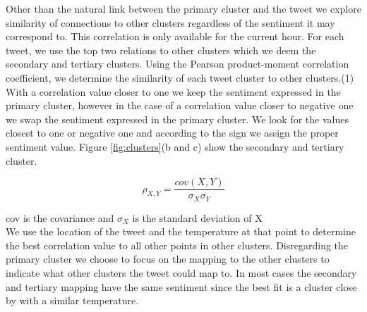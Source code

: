 \documentclass[journal]{vgtc}                %
\begin{document}
Other than the natural link between the primary cluster and the tweet we explore similarity of connections to other clusters regardless of the sentiment it may correspond to. This correlation is only available for the current hour. For each tweet, we use the top two relations to other clusters which we deem the secondary and tertiary clusters. Using the Pearson product-moment correlation coefficient, we determine the similarity of each tweet cluster to other clusters.(1) With a correlation value closer to one we keep the sentiment expressed in the primary cluster, however in the case of a correlation value closer to negative one we swap the sentiment expressed in the primary cluster. We look for the values closest to one or negative one and according to the sign we assign the proper sentiment value. Figure \ref{fig:clusters}(b and c) show the secondary and tertiary cluster.

\begin{equation}
\label{eq:pearson}
\rho_{X,Y}=\frac{cov(X,Y)}{\sigma_{X}\sigma_{Y}}
\end{equation}

cov is the covariance and $\sigma_{X}$ is the standard deviation of X \\

We use the location of the tweet and the temperature at that point to determine the best correlation value to all other points in other clusters. Disregarding the primary cluster we choose to focus on the mapping to the other clusters to indicate what other clusters the tweet could map to. In most cases the secondary and tertiary mapping have the same sentiment since the best fit is a cluster close by with a similar temperature. 
\end{document}
